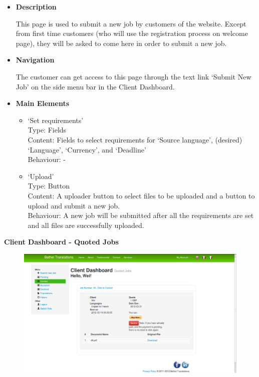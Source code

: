 \documentclass{l3proj}
\begin{document}
\begin{itemize}
\item \textbf{Description}

This page is used to submit a new job by customers of the website. Except from first time customers (who will use the registration process on welcome page), 
they will be asked to come here in order to submit a new job.

\item \textbf{Navigation}

The customer can get access to this page through the text link `Submit New Job' on the side menu bar in the Client Dashboard.

\item \textbf{Main Elements}
\begin{itemize}

\item `Set requirements'\\
Type: Fields\\
Content: Fields to select requirements for `Source language', (desired) `Language', `Currency', and `Deadline' \\
Behaviour: - \\

\item `Upload'\\
Type: Button\\
Content: A uploader button to select files to be uploaded and a button to upload and submit a new job.\\
Behaviour: A new job will be submitted after all the requirements are set and all files are successfully uploaded.\\

\end{itemize}
\end{itemize}


\textbf{Client Dashboard - Quoted Jobs}
\begin{figure}[H]
\centering
\includegraphics[width=0.8\linewidth]{images/clientDashQuoted}
\vspace{-30pt}
\end{figure}
\end{document}
